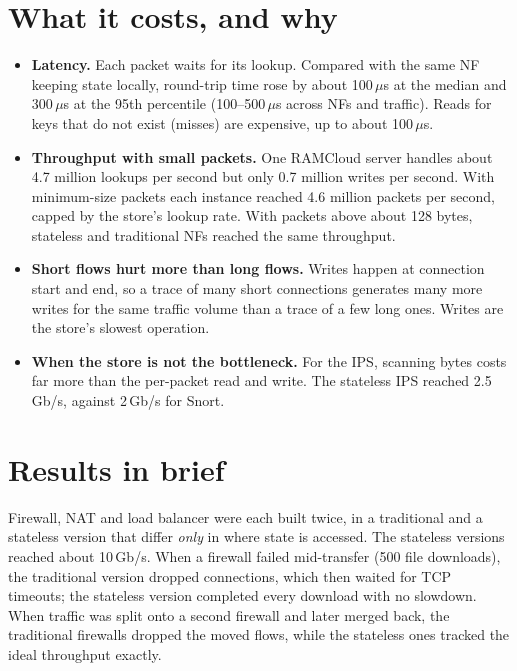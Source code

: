 \section{What it costs, and why}
\begin{itemize}
  \item \textbf{Latency.} Each packet waits for its lookup. Compared with the same NF keeping state locally, round-trip time rose by about
        100\,$\mu$s at the median and 300\,$\mu$s at the 95th percentile (100--500\,$\mu$s across NFs and traffic). Reads for keys that do not exist
        (misses) are expensive, up to about 100\,$\mu$s.
  \item \textbf{Throughput with small packets.} One RAMCloud server handles about 4.7 million lookups per second but only 0.7 million writes per second.
        With minimum-size packets each instance reached 4.6 million packets per second, capped by the store's lookup rate. With packets above
        about 128 bytes, stateless and traditional NFs reached the same throughput.
  \item \textbf{Short flows hurt more than long flows.} Writes happen at connection start and end, so a trace of many short connections generates many more
        writes for the same traffic volume than a trace of a few long ones. Writes are the store's slowest operation.
  \item \textbf{When the store is not the bottleneck.} For the IPS, scanning bytes costs far more than the per-packet read and write. The stateless IPS
        reached 2.5\,Gb/s, against 2\,Gb/s for Snort.
\end{itemize}

\section{Results in brief}
Firewall, NAT and load balancer were each built twice, in a traditional and a stateless version that differ \emph{only} in where state is
accessed. The stateless versions reached about 10\,Gb/s. When a firewall failed mid-transfer (500 file downloads), the traditional
version dropped connections, which then waited for TCP timeouts; the stateless version completed every download with no slowdown. When
traffic was split onto a second firewall and later merged back, the traditional firewalls dropped the moved flows, while the stateless ones
tracked the ideal throughput exactly.

